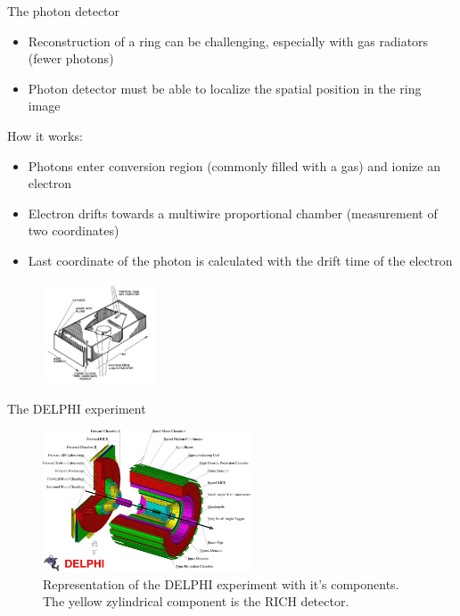 \documentclass[aspectratio=1610, 10pt]{beamer}
\begin{document}
\begin{frame}{The photon detector}
  \begin{itemize}
    \item Reconstruction of a ring can be challenging, especially with gas radiators (fewer photons)
    \medskip
    \item Photon detector must be able to localize the spatial position in the ring image
  \end{itemize}
How it works:
\begin{itemize}
  \item Photons enter conversion region (commonly filled with a gas) and ionize an electron
  \medskip
  \item Electron drifts towards a multiwire proportional chamber (measurement of two coordinates)
  \medskip
  \item Last coordinate of the photon is calculated with the drift time of the electron
\end{itemize}
  \begin{figure}
    \includegraphics[width=0.3\textwidth]{images/photon_det.png}
  \end{figure}
\end{frame}

\begin{frame}{The DELPHI experiment}
  \begin{figure}
    \includegraphics[width=0.55\textwidth]{images/delphi.jpg}
    \caption{Representation of the DELPHI experiment with it's components. The yellow zylindrical component is the RICH detector.}
  \end{figure}
\end{frame}
\end{document}
